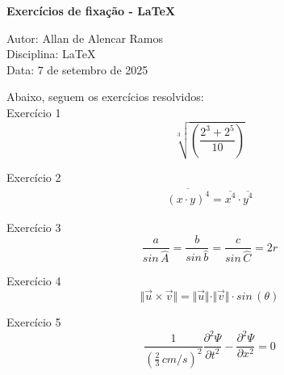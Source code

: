 \documentclass[12pt, a4paper]{article}
\begin{document}
\begin{center}
	\textbf{\large Exercícios de fixação - LaTeX}
\end{center}

\vspace{0.25cm}

\begin{flushleft}
Autor: Allan de Alencar Ramos \\
Disciplina: LaTeX \\
Data: 7 de setembro de 2025
\end{flushleft}

Abaixo, seguem os exercícios resolvidos: \\

Exercício 1 \\
\begin{equation}
\sqrt[3]{ \left(\frac{ 2^{3} + 2^{5} }{10}\right) }
\end{equation}

Exercício 2 \\
\begin{eqnarray}
\overline{ (x \cdot y)^{4} } = \overline{x^{4}} \cdot \overline{y^{4}}
\end{eqnarray}

Exercício 3 \\
\begin{equation}
\frac{a}{sin \, \widehat{A}} = 
\frac{b}{sin \, \widehat{b}} = 
\frac{c}{sin \, \widehat{C}} = 2r
\end{equation}

Exercício 4 \\
\begin{equation}
\Vert \vec{u} \times \vec{v} \Vert = 
\Vert \vec{u} \Vert \cdot
\Vert \vec{v} \Vert \cdot
sin \, (\theta)
\end{equation}

Exercício 5 \\
\begin{equation}
\frac{1}{ (\frac{2}{3} \, cm/s)^{2} } \frac{ \partial^{2} \Psi }{ \partial t^{2} } - 
\frac{ \partial^{2} \Psi }{ \partial x^{2} } = 0
\end{equation}
\end{document}
